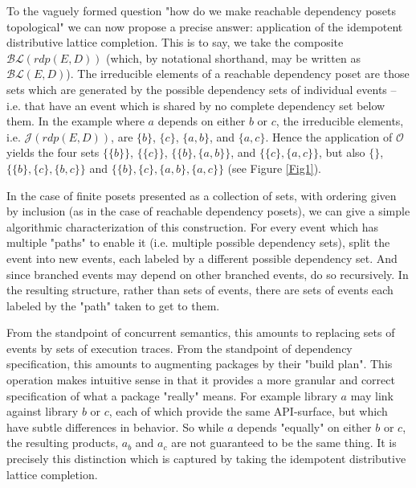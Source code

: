 \documentclass[hoptionsi,review,format=acmsmall]{acmart}
\theoremstyle{definition}
\newcommand{\Oc}{\mathcal{O}}
\newcommand{\Jc}{\mathcal{J}}
\newcommand{\BLc}{\mathcal{BL}}
\begin{document}


To the vaguely formed question "how do we make reachable dependency posets topological" we can now propose a precise answer: application of the idempotent distributive lattice completion. This is to say, we take the composite \(\BLc(rdp(E,D))\) (which, by notational shorthand, may be written as \(\BLc(E,D)\)). The irreducible elements of a reachable dependency poset are those sets which are generated by the possible dependency sets of individual events -- i.e. that have an event which is shared by no complete dependency set below them. In the example where \(a\) depends on either \(b\) or \(c\), the irreducible elements, i.e. \(\Jc(rdp(E,D))\), are \(\{b\}\), \(\{c\}\), \(\{a,b\}\), and \(\{a,c\}\). Hence the application of \(\Oc\) yields the four sets \(\{\{b\}\}\), \(\{\{c\}\}\), \(\{\{b\},\{a,b\}\}\), and \(\{\{c\},\{a,c\}\}\), but also \(\{\}\), \(\{\{b\},\{c\},\{b,c\}\}\) and \(\{\{b\},\{c\},\{a,b\},\{a,c\}\}\) (see Figure \ref{Fig1}).

In the case of finite posets presented as a collection of sets, with ordering given by inclusion (as in the case of reachable dependency posets), we can give a simple algorithmic characterization of this construction. For every event which has multiple "paths" to enable it (i.e. multiple possible dependency sets), split the event into new events, each labeled by a different possible dependency set. And since branched events may depend on other branched events, do so recursively. In the resulting structure, rather than sets of events, there are sets of events each labeled by the "path" taken to get to them. 

From the standpoint of concurrent semantics, this amounts to replacing sets of events by sets of execution traces. From the standpoint of dependency specification, this amounts to augmenting packages by their "build plan". This operation makes intuitive sense in that it provides a more granular and correct specification of what a package "really" means. For example library \(a\) may link against library \(b\) or \(c\), each of which provide the same API-surface, but which have subtle differences in behavior. So while \(a\) depends "equally" on either \(b\) or \(c\), the resulting products, \(a_b\) and \(a_c\) are not guaranteed to be the same thing. It is precisely this distinction which is captured by taking the idempotent distributive lattice completion.
\end{document}
